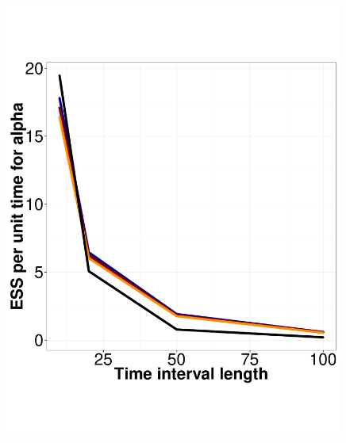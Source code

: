 \begin{figure}
\begin{minipage}[hp]{0.24\linewidth}
    \includegraphics [width=0.99\textwidth, angle=0]{figs/ESS_vs_t_alpha.pdf}
      \end{minipage}
  \begin{minipage}[hp]{0.24\linewidth}
  \centering

\end{minipage}
\end{figure}
